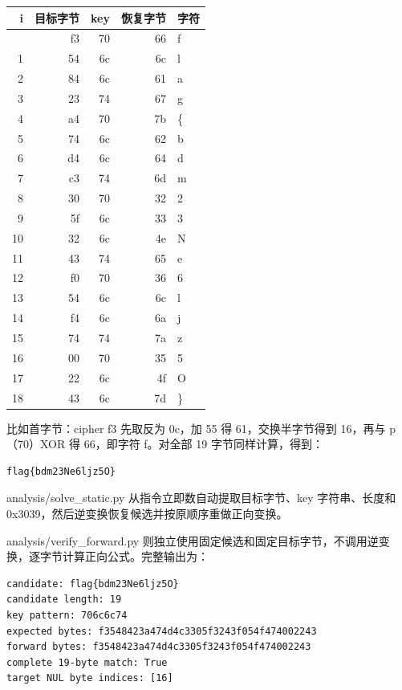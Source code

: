 {\def\LTcaptype{} %
\begin{longtable}[]{@{}rrrrl@{}}
\toprule\noalign{}
i & 目标字节 & key & 恢复字节 & 字符 \\
\midrule\noalign{}
\endhead
\bottomrule\noalign{}
\endlastfoot
0 & f3 & 70 & 66 & f \\
1 & 54 & 6c & 6c & l \\
2 & 84 & 6c & 61 & a \\
3 & 23 & 74 & 67 & g \\
4 & a4 & 70 & 7b & \{ \\
5 & 74 & 6c & 62 & b \\
6 & d4 & 6c & 64 & d \\
7 & c3 & 74 & 6d & m \\
8 & 30 & 70 & 32 & 2 \\
9 & 5f & 6c & 33 & 3 \\
10 & 32 & 6c & 4e & N \\
11 & 43 & 74 & 65 & e \\
12 & f0 & 70 & 36 & 6 \\
13 & 54 & 6c & 6c & l \\
14 & f4 & 6c & 6a & j \\
15 & 74 & 74 & 7a & z \\
16 & 00 & 70 & 35 & 5 \\
17 & 22 & 6c & 4f & O \\
18 & 43 & 6c & 7d & \} \\
\end{longtable}
}

比如首字节：cipher f3 先取反为 0c，加 55 得 61，交换半字节得到 16，再与 p（70）XOR 得 66，即字符 f。对全部 19 字节同样计算，得到：

\begin{verbatim}
flag{bdm23Ne6ljz5O}
\end{verbatim}

analysis/solve\_static.py 从指令立即数自动提取目标字节、key 字符串、长度和 0x3039，然后逆变换恢复候选并按原顺序重做正向变换。

analysis/verify\_forward.py 则独立使用固定候选和固定目标字节，不调用逆变换，逐字节计算正向公式。完整输出为：

\begin{verbatim}
candidate: flag{bdm23Ne6ljz5O}
candidate length: 19
key pattern: 706c6c74
expected bytes: f3548423a474d4c3305f3243f054f474002243
forward bytes: f3548423a474d4c3305f3243f054f474002243
complete 19-byte match: True
target NUL byte indices: [16]
\end{verbatim}

